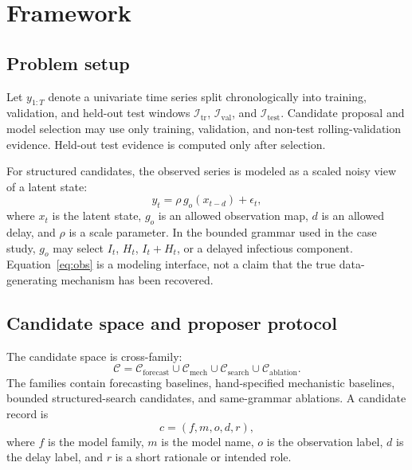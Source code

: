 \section{Framework}

\subsection{Problem setup}

Let $y_{1:T}$ denote a univariate time series split chronologically into
training, validation, and held-out test windows
$\mathcal{I}_{\mathrm{tr}}$, $\mathcal{I}_{\mathrm{val}}$, and
$\mathcal{I}_{\mathrm{test}}$. Candidate proposal and model selection may use
only training, validation, and non-test rolling-validation evidence. Held-out
test evidence is computed only after selection.

For structured candidates, the observed series is modeled as a scaled noisy
view of a latent state:
\begin{equation}
y_t = \rho\,g_o(x_{t-d}) + \epsilon_t,
\label{eq:obs}
\end{equation}
where $x_t$ is the latent state, $g_o$ is an allowed observation map, $d$ is an
allowed delay, and $\rho$ is a scale parameter. In the bounded grammar used in
the case study, $g_o$ may select $I_t$, $H_t$, $I_t+H_t$, or a delayed
infectious component. Equation~\ref{eq:obs} is a modeling interface, not a
claim that the true data-generating mechanism has been recovered.

\subsection{Candidate space and proposer protocol}

The candidate space is cross-family:
\begin{equation}
\mathcal{C} =
\mathcal{C}_{\mathrm{forecast}} \cup
\mathcal{C}_{\mathrm{mech}} \cup
\mathcal{C}_{\mathrm{search}} \cup
\mathcal{C}_{\mathrm{ablation}}.
\end{equation}
The families contain forecasting baselines, hand-specified mechanistic
baselines, bounded structured-search candidates, and same-grammar ablations.
A candidate record is
\begin{equation}
c = (f, m, o, d, r),
\end{equation}
where $f$ is the model family, $m$ is the model name, $o$ is the observation
label, $d$ is the delay label, and $r$ is a short rationale or intended role.

